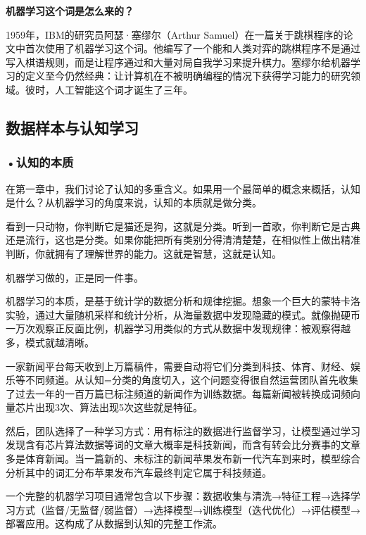 \begin{knowledgebox}
\small
\textbf{机器学习这个词是怎么来的？} 

1959年，IBM的研究员阿瑟·塞缪尔（Arthur Samuel）在一篇关于跳棋程序的论文中首次使用了机器学习这个词。他编写了一个能和人类对弈的跳棋程序不是通过写入棋谱规则，而是让程序通过和大量对局自我学习来提升棋力。塞缪尔给机器学习的定义至今仍然经典：让计算机在不被明确编程的情况下获得学习能力的研究领域。彼时，人工智能这个词才诞生了三年。
\end{knowledgebox}



\subsection{数据样本与认知学习}

\subsubsection*{\textbf{•认知的本质}}

在第一章中，我们讨论了认知的多重含义。如果用一个最简单的概念来概括，认知是什么？从机器学习的角度来说，认知的本质就是做分类。

看到一只动物，你判断它是猫还是狗，这就是分类。听到一首歌，你判断它是古典还是流行，这也是分类。如果你能把所有类别分得清清楚楚，在相似性上做出精准判断，你就拥有了理解世界的能力。这就是智慧，这就是认知。

机器学习做的，正是同一件事。

机器学习的本质，是基于统计学的数据分析和规律挖掘。想象一个巨大的蒙特卡洛实验，通过大量随机采样和统计分析，从海量数据中发现隐藏的模式。就像抛硬币一万次观察正反面比例，机器学习用类似的方式从数据中发现规律：被观察得越多，模式就越清晰。

一家新闻平台每天收到上万篇稿件，需要自动将它们分类到科技、体育、财经、娱乐等不同频道。从认知=分类的角度切入，这个问题变得很自然运营团队首先收集了过去一年的一百万篇已标注频道的新闻作为训练数据。每篇新闻被转换成词频向量芯片出现3次、算法出现5次这些就是特征。

然后，团队选择了一种学习方式：用有标注的数据进行监督学习，让模型通过学习发现含有芯片算法数据等词的文章大概率是科技新闻，而含有转会比分赛事的文章多是体育新闻。当一篇新的、未标注的新闻苹果发布新一代汽车到来时，模型综合分析其中的词汇分布苹果发布汽车最终判定它属于科技频道。

一个完整的机器学习项目通常包含以下步骤：数据收集与清洗→特征工程→选择学习方式（监督/无监督/弱监督）→选择模型→训练模型（迭代优化）→评估模型→部署应用。这构成了从数据到认知的完整工作流。

